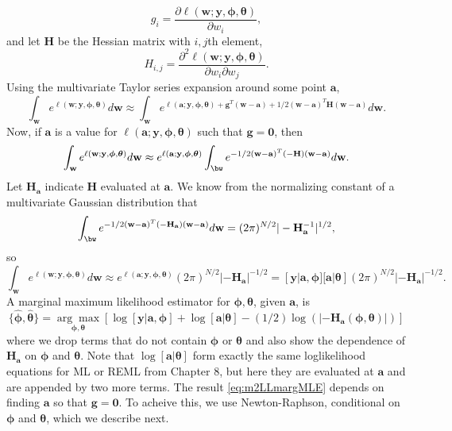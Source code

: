 \documentclass[12pt, titlepage]{article}
\begin{document}
$$
g_{i} = \frac{\partial \ell(\mathbf{w};\mathbf{y},\boldsymbol{\phi},\boldsymbol{\theta})}{\partial w_i},
$$
and let $\mathbf{H}$ be the Hessian matrix with $i,j$th element,
$$
H_{i,j} = \frac{\partial^2 \ell(\mathbf{w};\mathbf{y},\boldsymbol{\phi},\boldsymbol{\theta})}{\partial w_i\partial w_j}.
$$
Using the multivariate Taylor series expansion around some point $\mathbf{a}$,
$$
\int_\mathbf{w} e^{\ell(\mathbf{w};\mathbf{y},\boldsymbol{\phi},\boldsymbol{\theta})} d\mathbf{w} \approx \int_\mathbf{w} e^{\ell(\mathbf{a};\mathbf{y},\boldsymbol{\phi},\boldsymbol{\theta}) + \mathbf{g}^{T}(\mathbf{w} -\mathbf{a}) + 1/2(\mathbf{w} - \mathbf{a})^{T}\mathbf{H}(\mathbf{w} - \mathbf{a})} d\mathbf{w}.
$$
Now, if $\mathbf{a}$ is a value for $\ell(\mathbf{a};\mathbf{y},\boldsymbol{\phi},\boldsymbol{\theta})$ such that $\mathbf{g} = \mathbf{0}$, then
$$
\int_\mathbf{w} e^{\ell(\mathbf{w};\mathbf{y},\boldsymbol{\phi},\boldsymbol{\theta})} d\mathbf{w} \approx e^{\ell(\mathbf{a};\mathbf{y},\boldsymbol{\phi},\boldsymbol{\theta})} \int_\bw e^{ -  
	1/2(\mathbf{w} - \mathbf{a})^{T}(-\mathbf{H})(\mathbf{w} - \mathbf{a})} d\mathbf{w}.
$$
Let $\mathbf{H}_\mathbf{a}$ indicate $\mathbf{H}$ evaluated at $\mathbf{a}$. We know from the normalizing constant of a multivariate Gaussian distribution that 
$$
\int_\bw e^{-1/2(\mathbf{w} - \mathbf{a})^{T}(-\mathbf{H}_{\mathbf{a}})(\mathbf{w} - \mathbf{a})} d\mathbf{w} = (2\pi)^{N/2}|-\mathbf{H}^{-1}_\mathbf{a}|^{1/2},
$$
so
\[
\int_\mathbf{w} e^{\ell(\mathbf{w};\mathbf{y},\boldsymbol{\phi},\boldsymbol{\theta})} d\mathbf{w} \approx e^{\ell(\mathbf{a};\mathbf{y},\boldsymbol{\phi},\boldsymbol{\theta})} (2\pi)^{N/2}|-\mathbf{H}_\mathbf{a}|^{-1/2} = [\mathbf{y}|\mathbf{a},\boldsymbol{\phi}][\mathbf{a}|\boldsymbol{\theta}](2\pi)^{N/2}|-\mathbf{H}_\mathbf{a}|^{-1/2}.
\]
A marginal maximum likelihood estimator for $\boldsymbol{\phi}, \boldsymbol{\theta}$, given $\mathbf{a}$, is
\begin{equation} \label{eq:m2LLmargMLE}
\{\hat{\boldsymbol{\phi}}, \hat{\boldsymbol{\theta}} \} = \underset{\boldsymbol{\phi},\boldsymbol{\theta}}{\arg\max} \left[ \log[\mathbf{y}|\mathbf{a},\mathbf{\phi}] +
	\log[\mathbf{a}|\mathbf{\theta}] - (1/2)\log(|-\mathbf{H}_\mathbf{a}(\boldsymbol{\phi},\boldsymbol{\theta})|) \right]
\end{equation}
where we drop terms that do not contain $\boldsymbol{\phi}$ or $\boldsymbol{\theta}$ and also show the dependence of $\mathbf{H}_\mathbf{a}$ on $\boldsymbol{\phi}$ and $\boldsymbol{\theta}$.  Note that $\log[\mathbf{a}|\mathbf{\theta}]$ form exactly the same loglikelihood equations for ML or REML from Chapter 8, but here they are evaluated at $\mathbf{a}$ and are appended by two more terms.  The result \eqref{eq:m2LLmargMLE} depends on finding $\mathbf{a}$ so that $\mathbf{g} = \mathbf{0}$.  To acheive this, we use Newton-Raphson, conditional on $\boldsymbol{\phi}$ and $\boldsymbol{\theta}$, which we describe next.
\end{document}
